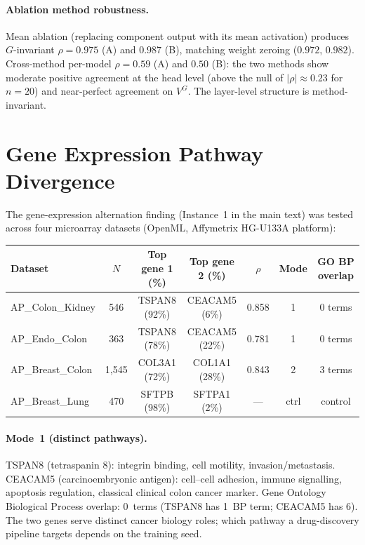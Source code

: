 \documentclass[11pt]{article}
\begin{document}
\paragraph{Ablation method robustness.}
Mean ablation (replacing component output with its mean activation) produces $G$-invariant $\rho = 0.975$ (A) and $0.987$ (B), matching weight zeroing ($0.972$, $0.982$).  Cross-method per-model $\rho = 0.59$ (A) and $0.50$ (B): the two methods show moderate positive agreement at the head level (above the null of $|\rho| \approx 0.23$ for $n = 20$) and near-perfect agreement on $V^G$.  The layer-level structure is method-invariant.

\section{Gene Expression Pathway Divergence}
\label{sec:gene-expression-si}

The gene-expression alternation finding (Instance~1 in the main text) was tested across four microarray datasets (OpenML, Affymetrix HG-U133A platform):

\begin{center}
\begin{tabular}{lcccccc}
\toprule
Dataset & $N$ & Top gene 1 (\%) & Top gene 2 (\%) & $\rho$ & Mode & GO BP overlap \\
\midrule
AP\_Colon\_Kidney & 546 & TSPAN8 (92\%) & CEACAM5 (6\%) & 0.858 & 1 & 0 terms \\
AP\_Endo\_Colon & 363 & TSPAN8 (78\%) & CEACAM5 (22\%) & 0.781 & 1 & 0 terms \\
AP\_Breast\_Colon & 1{,}545 & COL3A1 (72\%) & COL1A1 (28\%) & 0.843 & 2 & 3 terms \\
AP\_Breast\_Lung & 470 & SFTPB (98\%) & SFTPA1 (2\%) & --- & ctrl & control \\
\bottomrule
\end{tabular}
\end{center}

\paragraph{Mode~1 (distinct pathways).}
TSPAN8 (tetraspanin 8): integrin binding, cell motility, invasion/metastasis.  CEACAM5 (carcinoembryonic antigen): cell--cell adhesion, immune signalling, apoptosis regulation, classical clinical colon cancer marker.  Gene Ontology Biological Process overlap: 0~terms (TSPAN8 has 1~BP term; CEACAM5 has 6).  The two genes serve distinct cancer biology roles; which pathway a drug-discovery pipeline targets depends on the training seed.
\end{document}
